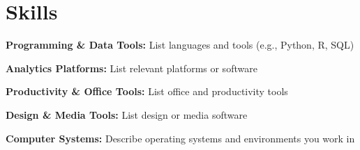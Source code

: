 \section{Skills}


\begin{onecolentry}
    \textbf{Programming \& Data Tools:} List languages and tools (e.g., Python, R, SQL)
\end{onecolentry}
\vspace{0.10cm}

\begin{onecolentry}
    \textbf{Analytics Platforms:} List relevant platforms or software
\end{onecolentry}
\vspace{0.10cm}

\begin{onecolentry}
    \textbf{Productivity \& Office Tools:} List office and productivity tools
\end{onecolentry}
\vspace{0.10cm}

\begin{onecolentry}
    \textbf{Design \& Media Tools:} List design or media software
\end{onecolentry}
\vspace{0.10cm}

\begin{onecolentry}
    \textbf{Computer Systems:} Describe operating systems and environments you work in
\end{onecolentry}
\vspace{0.10cm}
